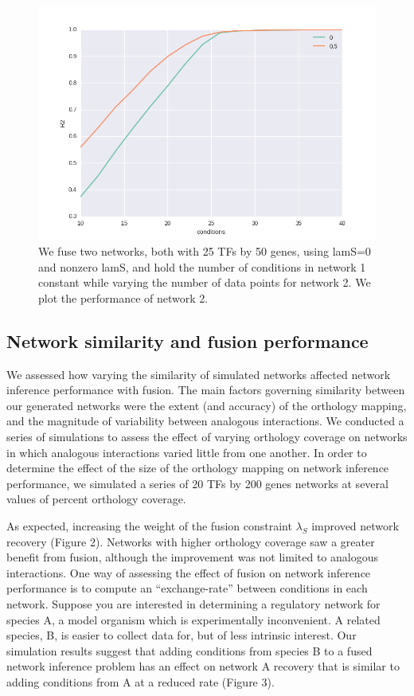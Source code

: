 \documentclass[11pt]{article}
\begin{document}
\begin{figure}
\begin{center}
  \includegraphics[scale=0.45]{increase_data2.png}
  \caption{\label{fig:figure1} We fuse two networks, both with 25 TFs by 50 genes, using lamS=0 and nonzero lamS, and hold the number of conditions in network 1 constant while varying the number of data points for network 2. We plot the performance of network 2.}
  \end{center}
\end{figure}

\subsection{Network similarity and fusion performance}
We assessed how varying the similarity of simulated networks affected network inference performance with fusion. The main factors governing similarity between our generated networks were the extent (and accuracy) of the orthology mapping, and the magnitude of variability between analogous interactions. We conducted a series of simulations to assess the effect of varying orthology coverage on networks in which analogous interactions varied little from one another. In order to determine the effect of the size of the orthology mapping on network inference performance, we simulated a series of 20 TFs by 200 genes networks at several values of percent orthology coverage. 

As expected, increasing the weight of the fusion constraint $\lambda_S$ improved network recovery (Figure 2). Networks with higher orthology coverage saw a greater benefit from fusion, although the improvement was not limited to analogous interactions. One way of assessing the effect of fusion on network inference performance is to compute an ``exchange-rate'' between conditions in each network. Suppose you are interested in determining a regulatory network for species A, a model organism which is experimentally inconvenient. A related species, B, is easier to collect data for, but of less intrinsic interest. Our simulation results suggest that adding conditions from species B to a fused network inference problem has an effect on network A recovery that is similar to adding conditions from A at a reduced rate (Figure 3). 
\end{document}
